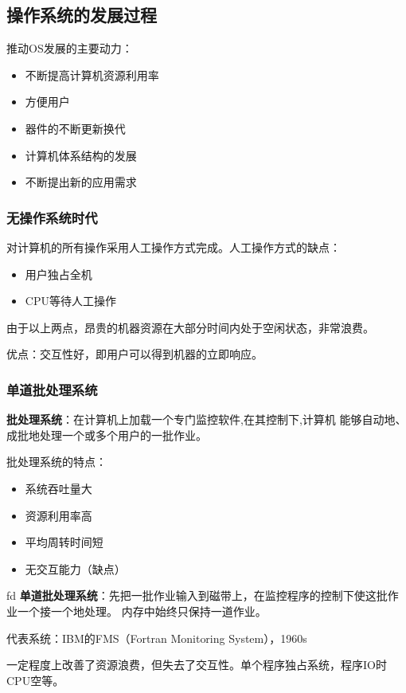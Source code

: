 \documentclass[12pt, a4paper, oneside]{ctexart}
\begin{document}
\subsection{操作系统的发展过程}

推动OS发展的主要动力：
\begin{itemize}
    \item 不断提高计算机资源利用率
    \item 方便用户
    \item 器件的不断更新换代
    \item 计算机体系结构的发展
    \item 不断提出新的应用需求
\end{itemize}

\subsubsection{无操作系统时代}

对计算机的所有操作采用人工操作方式完成。人工操作方式的缺点：
\begin{itemize}
    \item 用户独占全机
    \item CPU等待人工操作
\end{itemize}

由于以上两点，昂贵的机器资源在大部分时间内处于空闲状态，非常浪费。

优点：交互性好，即用户可以得到机器的立即响应。

\subsubsection{单道批处理系统}

\textbf{批处理系统}：在计算机上加载一个专门监控软件,在其控制下,计算机
能够自动地、成批地处理一个或多个用户的一批作业。

批处理系统的特点：
\begin{itemize}
    \item 系统吞吐量大
    \item 资源利用率高
    \item 平均周转时间短
    \item 无交互能力（缺点）
\end{itemize}
 fd
\textbf{单道批处理系统}：先把一批作业输入到磁带上，在监控程序的控制下使这批作业一个接一个地处理。
内存中始终只保持一道作业。

代表系统：IBM的FMS（Fortran Monitoring System），1960s

一定程度上改善了资源浪费，但失去了交互性。单个程序独占系统，程序IO时CPU空等。
\end{document}
